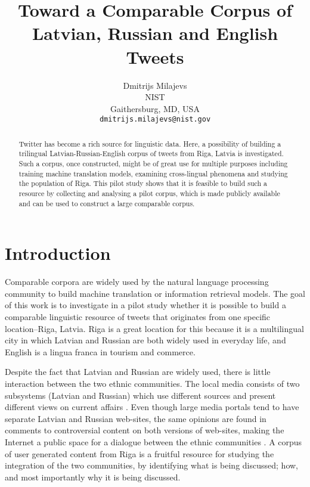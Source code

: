 \documentclass[11pt,a4paper]{article}
\title{Toward a Comparable Corpus of Latvian, Russian and English Tweets}
\author{Dmitrijs Milajevs \\
  NIST \\
  Gaithersburg, MD, USA \\
  {\tt dmitrijs.milajevs@nist.gov}}
\date{}
\begin{document}
\maketitle

\begin{abstract}
Twitter has become a rich source for linguistic data. Here, a possibility of building a trilingual Latvian-Russian-English corpus of tweets from Riga, Latvia is investigated. Such a corpus, once constructed, might be of great use for multiple purposes including  training machine translation models, examining cross-lingual phenomena and studying the population of Riga. This pilot study shows that it is feasible to build such a resource by collecting and analysing a pilot corpus, which is made publicly available and can be used to construct a large comparable corpus.
\end{abstract}

\section{Introduction}
\label{sec:introduction}

Comparable corpora are widely used by the natural language processing community to build machine translation or information retrieval models. The goal of this work is to investigate in  a pilot study whether it is possible to build a comparable linguistic resource of tweets that originates from one specific location--Riga, Latvia. Riga is a great location for this because it is a multilingual city in which Latvian and Russian are both widely used in everyday life, and English is a lingua franca in tourism and commerce.

Despite the fact that Latvian and Russian are widely used, there is little interaction between the two ethnic communities. The local media consists of two subsystems (Latvian and Russian) which use different sources and present different views on current affairs \cite{muiznieks2010}. Even though large media portals tend to have separate Latvian and Russian web-sites, the same opinions are found in comments to controversial content on both versions of web-sites, making the Internet a public space for a dialogue  between the ethnic communities \cite{sulmane2010}. A corpus of user generated content from Riga is a fruitful resource for studying the integration of the two communities, by identifying what is being discussed; how, and most importantly why it is being discussed.
\end{document}
